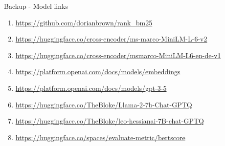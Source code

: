 \documentclass{beamer}
\begin{document}
\begin{frame}{Backup - Model links}
  \tiny{
  \begin{enumerate}
    \item \url{https://github.com/dorianbrown/rank_bm25}
    \item \url{https://huggingface.co/cross-encoder/ms-marco-MiniLM-L-6-v2}
    \item \url{https://huggingface.co/cross-encoder/msmarco-MiniLM-L6-en-de-v1}
    \item \url{https://platform.openai.com/docs/models/embeddings}
    \item \url{https://platform.openai.com/docs/models/gpt-3-5}
    \item \url{https://huggingface.co/TheBloke/Llama-2-7b-Chat-GPTQ}
    \item \url{https://huggingface.co/TheBloke/leo-hessianai-7B-chat-GPTQ}
    \item \url{https://huggingface.co/spaces/evaluate-metric/bertscore}
  \end{enumerate}
  }
\end{frame}





\end{document}
